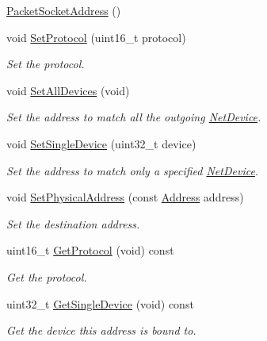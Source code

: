 \begin{DoxyCompactItemize}
\item 
\hyperlink{classns3_1_1PacketSocketAddress_a1ef0ff511c019ff53496019aa8ec9c6a}{Packet\+Socket\+Address} ()
\item 
void \hyperlink{classns3_1_1PacketSocketAddress_a9020962e39c238277f3b2f0de605647a}{Set\+Protocol} (uint16\+\_\+t protocol)
\begin{DoxyCompactList}\small\item\em Set the protocol. \end{DoxyCompactList}\item 
void \hyperlink{classns3_1_1PacketSocketAddress_a9bfc218130b3c7777ff684157a56e42f}{Set\+All\+Devices} (void)
\begin{DoxyCompactList}\small\item\em Set the address to match all the outgoing \hyperlink{classns3_1_1NetDevice}{Net\+Device}. \end{DoxyCompactList}\item 
void \hyperlink{classns3_1_1PacketSocketAddress_ad1caa016f4d27c9d5f2c06dbfc53f8a3}{Set\+Single\+Device} (uint32\+\_\+t device)
\begin{DoxyCompactList}\small\item\em Set the address to match only a specified \hyperlink{classns3_1_1NetDevice}{Net\+Device}. \end{DoxyCompactList}\item 
void \hyperlink{classns3_1_1PacketSocketAddress_a9452f9410a97e57344e464e25c2ab0f3}{Set\+Physical\+Address} (const \hyperlink{classns3_1_1Address}{Address} address)
\begin{DoxyCompactList}\small\item\em Set the destination address. \end{DoxyCompactList}\item 
uint16\+\_\+t \hyperlink{classns3_1_1PacketSocketAddress_a85c4d60072a651fdf0384885d9296d16}{Get\+Protocol} (void) const 
\begin{DoxyCompactList}\small\item\em Get the protocol. \end{DoxyCompactList}\item 
uint32\+\_\+t \hyperlink{classns3_1_1PacketSocketAddress_afa5bd3df95fae495a0ff876c3c57ff9c}{Get\+Single\+Device} (void) const 
\begin{DoxyCompactList}\small\item\em Get the device this address is bound to. \end{DoxyCompactList}\item 

\end{DoxyCompactItemize}
